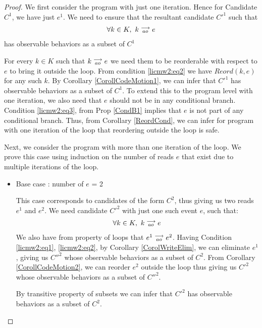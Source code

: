 \begin{proof}

    We first consider the program with just one iteration. 
    Hence for Candidate $C^1$, we have just $e^1$. 
    We need to ensure that the resultant candidate $C'^1$ such that 
    \begin{align*}
        \forall k \in K, \ k\stackrel{\longrightarrow}{_{ao}}e
    \end{align*}  
    has observable behaviors as a subset of $C^1$

    For every $k \in K$ such that $k\stackrel{\longrightarrow}{_{ao}}e$ we need them to be reorderable with respect to $e$ to bring it outside the loop.
    From condition \ref{licmw2:eq2} we have $Reord(k,e)$ for any such $k$.
    By Corollary \ref{CorollCodeMotion1}, we can infer that $C'^1$ has observable behaviors as a subset of $C^1$.
    To extend this to the program level with one iteration, we also need that $e$ should not be in any conditional branch.
    Condition \ref{licmw2:eq3}, from Prop \ref{CondB1} implies that $e$ is not part of any conditional branch.
    Thus, from Corollary \ref{ReordCond}, we can infer for program with one iteration of the loop that reordering outside the loop is safe. 
    
    Next, we consider the program with more than one iteration of the loop. 
    We prove this case using induction on the number of reads $e$ that exist due to multiple iterations of the loop. 

    \begin{itemize}

        \item Base case : number of $e$ = 2
    
        This case corresponds to candidates of the form $C^2$, thus giving us two reads $e^1$ and $e^2$.
        We need candidate $C'^2$ with just one such event $e$, such that:
        \begin{align*}
            \forall k \in K, \ k\stackrel{\longrightarrow}{_{ao}}e
        \end{align*}  
        We also have from property of loops that $e^1\stackrel{\longrightarrow}{_{ao}}e^2$.
        Having Condition \ref{licmw2:eq1}, \ref{licmw2:eq2}, by Corollary \ref{CorolWriteElim}, we can eliminate $e^1$, giving us $C''^2$ whose observable behaviors as a subset of $C^2$.  
        From Corollary \ref{CorollCodeMotion2}, we can reorder $e^2$ outside the loop thus giving us $C'^2$ whose observable behaviors as a subset of $C''^2$.
        
        By transitive property of subsets we can infer that $C'^2$ has observable behaviors as a subset of $C^2$.
        

\end{itemize}
\end{proof}
